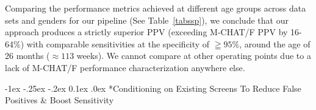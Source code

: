 \documentclass[onecolumn,,10pt]{IEEEtran}
\makeatletter
\renewcommand\subsection{\@startsection {section}{1}{\z@}%
  {-1ex \@plus -.25ex \@minus -.2ex}%
  {0.1ex \@plus.0ex}%
  {\fontsize{11}{12}\selectfont\bfseries\sffamily\color{DodgerBlue4}}}
\makeatother
\begin{document}
Comparing the performance metrics achieved at different age groups across data sets and genders for our pipeline (See Table~\ref{tabssp}), we conclude that our approach produces a strictly superior PPV (exceeding M-CHAT/F PPV by 16-64\%)  with comparable sensitivities  at the specificity of $\geqq 95\%$, around the age of 26 months ($\approx 113$ weeks). We cannot compare at other operating points due to a lack of M-CHAT/F performance characterization anywhere else.


\subsection*{Conditioning on  Existing Screens To Reduce False Positives \& Boost Sensitivity}
\end{document}
